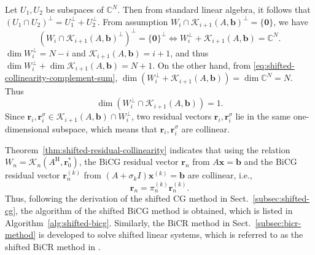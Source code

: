 \begin{Proof}
{Let $U_1,U_2$ be subspaces of $\mathbb C^N$. Then from standard linear algebra, it follows that $(U_1\cap U_2)^{\perp}=U_1^{\perp}+U_2^{\perp}$. From assumption $W_i\cap\mathcal K_{i+1}(A,\bm b)^{\perp}=\{\bm0\}$, we have}
\begin{equation}\label{eq:shifted-collinearity-complement-sum}(W_i\cap\mathcal K_{i+1}(A,\bm b)^{\perp})^{\perp}=\{\bm0\}^{\perp}\Leftrightarrow W_i^{\perp}+\mathcal K_{i+1}(A,\bm b)=\mathbb C^N.\end{equation}
{$\dim W_i^{\perp}=N-i$ and $\mathcal K_{i+1}(A,\bm b)=i+1$, and thus $\dim W_i^{\perp}+\dim\mathcal K_{i+1}(A,\bm b)=N+1$. On the other hand, from \eqref{eq:shifted-collinearity-complement-sum}, $\dim(W_i^{\perp}+\mathcal K_{i+1}(A,\bm b))=\dim\mathbb C^N=N$. Thus}
\[\dim(W_i^{\perp}\cap\mathcal K_{i+1}(A,\bm b))=1.\]
{Since $\bm r_i,\bm r_i^{\sigma}\in\mathcal K_{i+1}(A,\bm b)\cap W_i^{\perp}$, two residual vectors $\bm r_i,\bm r_i^{\sigma}$ lie in the same one-dimensional subspace, which means that $\bm r_i,\bm r_i^{\sigma}$ are collinear.}\par\nopagebreak[4]\end{Proof}
{Theorem\ \ref{thm:shifted-residual-collinearity} indicates that using the relation $W_n=\mathcal K_n(A^{\mathrm H},\bm r_0^*)$, the BiCG residual vector $\bm r_n$ from $A\bm x=\bm b$ and the BiCG residual vector $\bm r_n^{(k)}$ from $(A+\sigma_k I)\bm x^{(k)}=\bm b$ are collinear, i.e.,}
\[\bm r_n=\pi_n^{(k)}\bm r_n^{(k)}.\]
{Thus, following the derivation of the shifted CG method in Sect.\ \ref{subsec:shifted-cg}, the algorithm of the shifted BiCG method is obtained, which is listed in Algorithm\ \ref{alg:shifted-bicg}. Similarly, the BiCR method in Sect.\ \ref{subsec:bicr-method} is developed to solve shifted linear systems, which is referred to as the shifted BiCR method in .}
